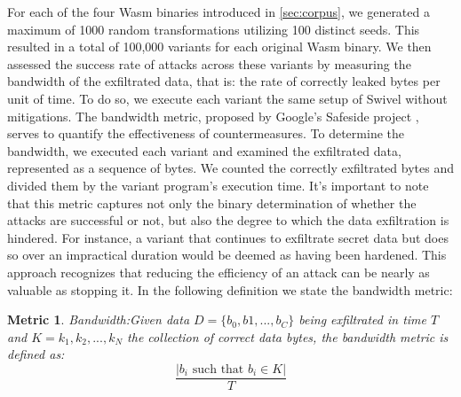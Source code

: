 \documentclass[sigplan,screen]{acmart}
\newcommand*\badge[1]{ \colorbox{red}{\color{white}#1}}
\newcommand{\wasm}{Wasm\xspace}
\newtheorem{metric}{Metric}
\newcommand{\todo}[1]{%
\refstepcounter{todo}
\noindent\textbf{\badge{TODO}} {\color{red}#1}
\addcontentsline{td}{todo}
{\color{red}\thesection.\thetodo\xspace #1}}
\begin{document}

For each of the four \wasm binaries introduced in \autoref{sec:corpus}, we generated a maximum of 1000 random transformations utilizing 100 distinct seeds. 
This resulted in a total of 100,000 variants for each original \wasm binary.
We then assessed the success rate of attacks across these variants by measuring the bandwidth of the exfiltrated data, that is: the rate of correctly leaked bytes per unit of time. 
To do so, we execute each variant the same setup of Swivel without mitigations.
The bandwidth metric, proposed by Google's Safeside project \cite{safeside}, serves to quantify the effectiveness of countermeasures.
To determine the bandwidth, we executed each variant and examined the exfiltrated data, represented as a sequence of bytes. 
We counted the correctly exfiltrated bytes and divided them by the variant program's execution time. 
It's important to note that this metric captures not only the binary determination of whether the attacks are successful or not, but also the degree to which the data exfiltration is hindered.
For instance, a variant that continues to exfiltrate secret data but does so over an impractical duration would be deemed as having been hardened. 
This approach recognizes that reducing the efficiency of an attack can be nearly as valuable as stopping it.
In the following definition we state the bandwidth metric:

\begin{metric}{Bandwidth:}\label{metric:ber}
Given data $D=\{b_0, b1, ..., b_C\}$ being exfiltrated in time $T$ and $K = {k_1, k_2, ..., k_N}$ the collection of correct data bytes, the bandwidth metric is defined as:
$$
    \frac{|b_i\text{ such that } b_i \in K|}{T}
$$
\end{metric}
\end{document}
